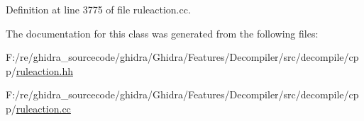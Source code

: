 Definition at line 3775 of file ruleaction.\+cc.



The documentation for this class was generated from the following files\+:\begin{DoxyCompactItemize}
\item 
F\+:/re/ghidra\+\_\+sourcecode/ghidra/\+Ghidra/\+Features/\+Decompiler/src/decompile/cpp/\mbox{\hyperlink{ruleaction_8hh}{ruleaction.\+hh}}\item 
F\+:/re/ghidra\+\_\+sourcecode/ghidra/\+Ghidra/\+Features/\+Decompiler/src/decompile/cpp/\mbox{\hyperlink{ruleaction_8cc}{ruleaction.\+cc}}\end{DoxyCompactItemize}
